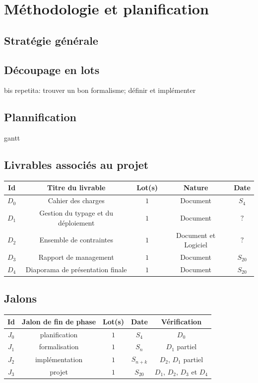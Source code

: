 \documentclass[a4paper]{article}
\begin{document}
\section{Méthodologie et planification}
\subsection{Stratégie générale}
\subsection{Découpage en lots}
bis repetita: trouver un bon formalisme; définir et implémenter
\subsection{Plannification}
gantt
\subsection{Livrables associés au projet}
\begin{table}
\centering
\begin{tabular}{c|c|c|c|c}
	Id & Titre du livrable & Lot(s) & Nature & Date \\
	\hline
	\hline
	$D_0$ & Cahier des charges & $1$ & Document & $S_4$ \\
	\hline
	$D_1$ & Gestion du typage et du déploiement & $1$ & Document & $?$ \\
	\hline
	$D_2$ & Ensemble de contraintes & $1$ & Document et Logiciel & $?$ \\
	\hline
	$D_3$ & Rapport de management & $1$ & Document & $S_{20}$ \\
	\hline
	$D_4$ & Diaporama de présentation finale & $1$ & Document & $S_{20}$ \\
\end{tabular}
\end{table}

\subsection{Jalons}
\begin{table}
\centering
\begin{tabular}{c|c|c|c|c}
	Id & Jalon de fin de phase & Lot(s) & Date & Vérification \\
	\hline
	\hline
	$J_0$ & planification & $1$ & $S_4$ & $D_0$ \\
	\hline
	$J_1$ & formalisation & $1$ & $S_n$ & $D_1$ partiel \\
	\hline
	$J_2$ & implémentation & $1$ & $S_{n+k}$ & $D_2$, $D_1$ partiel \\
	\hline
	$J_3$ & projet & $1$ & $S_{20}$ & $D_1$, $D_2$, $D_3$ et $D_4$ \\
\end{tabular}
\end{table}
\end{document}
